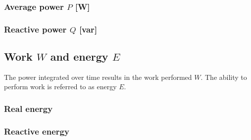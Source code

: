 \documentclass{article}
\begin{document}
\subsubsection{Average power $P$ [W]}

\subsubsection{Reactive power $Q$ [var]}

\subsection{Work $W$ and energy $E$}
The power integrated over time results in the work performed $W$.
The ability to perform work is referred to as energy $E$.

\subsubsection{Real energy}

\subsubsection{Reactive energy}
\end{document}
